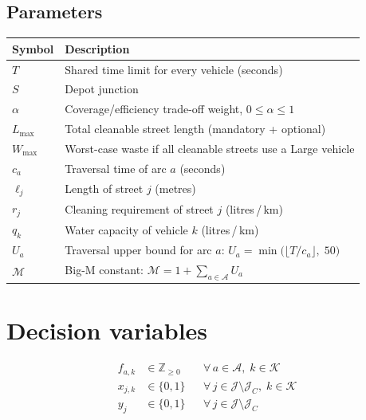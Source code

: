 \documentclass[11pt]{article}
\newcommand{\setA}{\mathcal{A}}   %
\newcommand{\setJ}{\mathcal{J}}   %
\newcommand{\setK}{\mathcal{K}}   %
\newcommand{\Jc}{\mathcal{J}_C}   %
\newcommand{\depot}{S}
\begin{document}
\subsection{Parameters}

\begin{table}[h]
\centering
\begin{tabular}{@{} l l @{}}
\toprule
Symbol & Description \\
\midrule
$T$            & Shared time limit for every vehicle (seconds) \\
$\depot$       & Depot junction \\
$\alpha$       & Coverage/efficiency trade-off weight, $0 \le \alpha \le 1$ \\
$L_{\max}$     & Total cleanable street length (mandatory + optional) \\
$W_{\max}$     & Worst-case waste if all cleanable streets use a Large vehicle \\
$c_a$          & Traversal time of arc $a$ (seconds) \\
$\ell_j$       & Length of street $j$ (metres) \\
$r_j$          & Cleaning requirement of street $j$ (litres\,/\,km) \\
$q_k$          & Water capacity of vehicle $k$ (litres\,/\,km) \\
$U_a$          & Traversal upper bound for arc $a$: $U_a = \min\!\bigl(\lfloor T / c_a \rfloor,\; 50\bigr)$ \\
$\mathcal{M}$  & Big-M constant: $\mathcal{M} = 1 + \sum_{a \in \setA} U_a$ \\
\bottomrule
\end{tabular}
\end{table}

\section{Decision variables}

\begin{align}
f_{a,k} &\in \mathbb{Z}_{\ge 0}
    &&\forall\, a \in \setA,\; k \in \setK
    \tag{flow variable}\\[4pt]
x_{j,k} &\in \{0,1\}
    &&\forall\, j \in \setJ \setminus \Jc,\; k \in \setK
    \tag{cleaning assignment}\\[4pt]
y_j     &\in \{0,1\}
    &&\forall\, j \in \setJ \setminus \Jc
    \tag{cleaned indicator}
\end{align}
\end{document}
